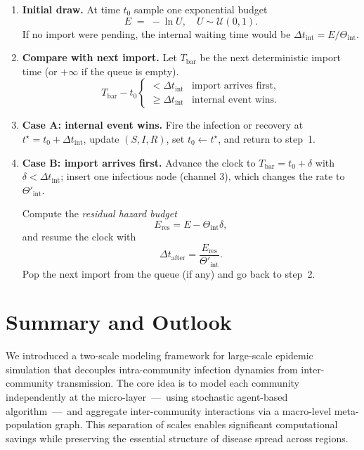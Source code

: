 \documentclass[
]{ceurart}
\begin{document}
\begin{enumerate}\setlength{\itemsep}{2pt}
  \item \textbf{Initial draw.}\;  
        At time $t_0$ sample one exponential budget  
        \[
          E \;=\; -\ln U, \quad U\sim\mathcal U(0,1).
        \]
        If no import were pending, the internal waiting time would be
        $\Delta t_{\text{int}}=E/\Theta_{\text{int}}$.

  \item \textbf{Compare with next import.}\;  
        Let $T_{\mathrm{bar}}$ be the next deterministic import time
        (or $+\infty$ if the queue is empty).  
        \[
          T_{\mathrm{bar}} - t_0
          \mathrel{\begin{cases}
            < \Delta t_{\text{int}} & \text{import arrives first},\\
            \ge \Delta t_{\text{int}} & \text{internal event wins}.
          \end{cases}}
        \]

  \item \textbf{Case A: internal event wins.}\;  
        Fire the infection or recovery at
        $t^\star=t_0+\Delta t_{\text{int}}$,  
        update $(S,I,R)$, set $t_0\gets t^\star$, and return to step~1.

  \item \textbf{Case B: import arrives first.}\;
        Advance the clock to $T_{\mathrm{bar}}=t_0+\delta$
        with $\delta<\Delta t_{\text{int}}$;  
        insert one infectious node
        (channel 3), which changes the rate to $\Theta'_{\text{int}}$.

        \smallskip\noindent
        Compute the \emph{residual hazard budget}
        \[
          E_{\text{res}} = E - \Theta_{\text{int}}\delta,
        \]
        and resume the clock with
        \[
          \Delta t_{\text{after}}
          = \frac{E_{\text{res}}}{\Theta'_{\text{int}}}.
        \]
        Pop the next import from the queue (if any) and go back to
        step~2.
\end{enumerate}

\section{Summary and Outlook}

We introduced a two-scale modeling framework for large-scale epidemic simulation that decouples intra-community infection dynamics from inter-community transmission. The core idea is to model each community independently at the micro-layer~—~using stochastic agent-based algorithm~—~and aggregate inter-community interactions via a macro-level meta-population graph. This separation of scales enables significant computational savings while preserving the essential structure of disease spread across regions.
\end{document}
